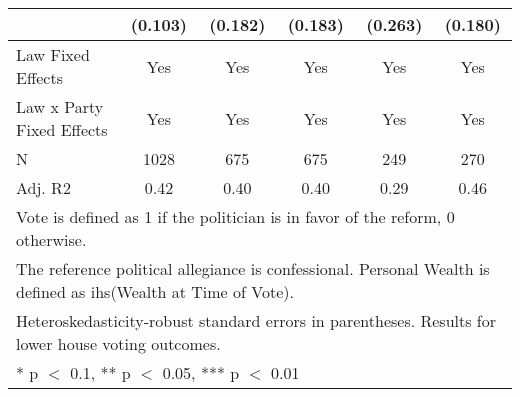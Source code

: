\begin{table}
\begin{tabular}[t]{lccccc}
 & (\num{0.103}) & (\num{0.182}) & (\num{0.183}) & (\num{0.263}) & (\num{0.180})\\
\midrule
Law Fixed Effects & Yes & Yes & Yes & Yes & Yes\\
Law x Party Fixed Effects & Yes & Yes & Yes & Yes & Yes\\
N & \num{1028} & \num{675} & \num{675} & \num{249} & \num{270}\\
Adj. R2 & \num{0.42} & \num{0.40} & \num{0.40} & \num{0.29} & \num{0.46}\\
\bottomrule
\multicolumn{6}{l}{\rule{0pt}{1em}Vote is defined as 1 if the politician is in favor of the reform, 0 otherwise.}\\
\multicolumn{6}{l}{\rule{0pt}{1em}The reference political allegiance is confessional. Personal Wealth is defined as ihs(Wealth at Time of Vote).}\\
\multicolumn{6}{l}{\rule{0pt}{1em}Heteroskedasticity-robust standard errors in parentheses. Results for lower house voting outcomes.}\\
\multicolumn{6}{l}{\rule{0pt}{1em}* p $<$ 0.1, ** p $<$ 0.05, *** p $<$ 0.01}\\
\end{tabular}
\end{table}
